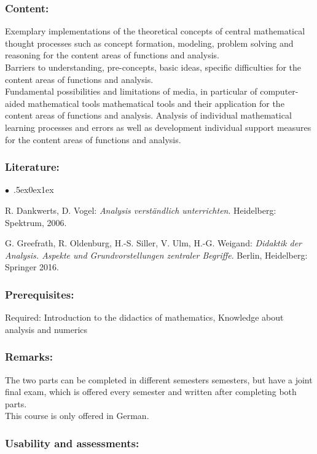 \documentclass[a4paper,10pt]{article}
\renewenvironment{itemize}{\begin{list}{$\bullet$\ }{\itemsep.5ex\setlength{\topsep}{0.5\itemsep}\parsep0ex\labelsep1ex\settowidth{\labelwidth}{$\bullet$\ }\setlength{\leftmargin}{\labelwidth}\addtolength{\leftmargin}{3ex}\addtolength{\leftmargin}{\labelsep}}}{\end{list}}
\begin{document}
\subsubsection*{\large
    Content:
}
Exemplary implementations of the theoretical concepts of central mathematical thought processes such as concept formation, modeling, problem solving and reasoning for the content areas of functions and analysis. \\
Barriers to understanding, pre-concepts, basic ideas, specific difficulties for the content areas of functions
and analysis. \\
Fundamental possibilities and limitations of media, in particular of computer-aided mathematical tools mathematical tools and their application for the content areas of functions and analysis.
Analysis of individual mathematical learning processes and errors as well as development individual support measures for
the content areas of functions and analysis.
\subsubsection*{\large
    Literature:
}
\begin{itemize}
\item
R. Dankwerts, D. Vogel: \emph{Analysis verständlich unterrichten}. Heidelberg: Spektrum, 2006. 
 \item
G. Greefrath, R. Oldenburg, H.-S. Siller, V. Ulm, H.-G. Weigand: \emph{Didaktik der Analysis. Aspekte und Grundvorstellungen zentraler Begriffe}. Berlin, Heidelberg: Springer 2016.
\end{itemize}
\subsubsection*{\large
    Prerequisites:
}
Required: Introduction to the didactics of mathematics, Knowledge about analysis and numerics
\subsubsection*{\large
    Remarks:
}
The two parts can be completed in different semesters semesters, but have a joint final exam, which is offered every semester and written after completing both parts. \\ This course is only offered in German.
\subsubsection*{\large
    Usability and assessments:
}
\end{document}
